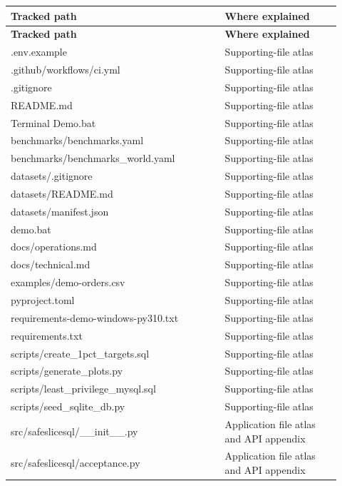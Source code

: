 \begin{longtable}{>{\raggedright\arraybackslash}p{0.598\linewidth}>{\raggedright\arraybackslash}p{0.322\linewidth}}
\toprule
\textbf{Tracked path} & \textbf{Where explained} \\
\midrule
\endfirsthead
\toprule
\textbf{Tracked path} & \textbf{Where explained} \\
\midrule
\endhead
.env.example & Supporting-file atlas \\[4pt]
.github/workflows/ci.yml & Supporting-file atlas \\[4pt]
.gitignore & Supporting-file atlas \\[4pt]
README.md & Supporting-file atlas \\[4pt]
Terminal Demo.bat & Supporting-file atlas \\[4pt]
benchmarks/benchmarks.yaml & Supporting-file atlas \\[4pt]
benchmarks/benchmarks\_world.yaml & Supporting-file atlas \\[4pt]
datasets/.gitignore & Supporting-file atlas \\[4pt]
datasets/README.md & Supporting-file atlas \\[4pt]
datasets/manifest.json & Supporting-file atlas \\[4pt]
demo.bat & Supporting-file atlas \\[4pt]
docs/operations.md & Supporting-file atlas \\[4pt]
docs/technical.md & Supporting-file atlas \\[4pt]
examples/demo-orders.csv & Supporting-file atlas \\[4pt]
pyproject.toml & Supporting-file atlas \\[4pt]
requirements-demo-windows-py310.txt & Supporting-file atlas \\[4pt]
requirements.txt & Supporting-file atlas \\[4pt]
scripts/create\_1pct\_targets.sql & Supporting-file atlas \\[4pt]
scripts/generate\_plots.py & Supporting-file atlas \\[4pt]
scripts/least\_privilege\_mysql.sql & Supporting-file atlas \\[4pt]
scripts/seed\_sqlite\_db.py & Supporting-file atlas \\[4pt]
src/safeslicesql/\_\_init\_\_.py & Application file atlas and API appendix \\[4pt]
src/safeslicesql/acceptance.py & Application file atlas and API appendix \\[4pt]

\end{longtable}
